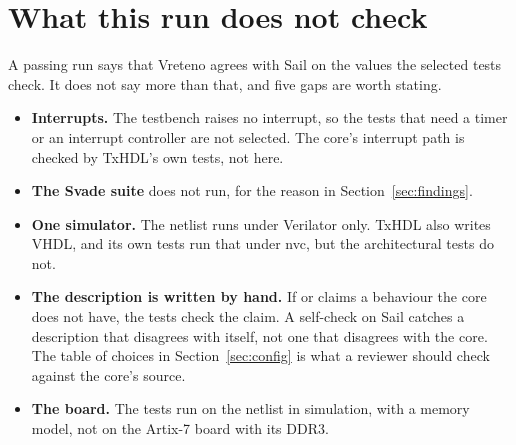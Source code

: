 \section{What this run does not check}
\label{sec:limits}

A passing run says that Vreteno agrees with Sail on the values the
selected tests check. It does not say more than that, and five gaps
are worth stating.

\begin{itemize}
\item \textbf{Interrupts.} The testbench raises no interrupt, so the
tests that need a timer or an interrupt controller are not selected.
The core's interrupt path is checked by TxHDL's own tests, not here.
\item \textbf{The Svade suite} does not run, for the reason in
Section~\ref{sec:findings}.
\item \textbf{One simulator.} The netlist runs under Verilator only.
TxHDL also writes VHDL, and its own tests run that under nvc, but the
architectural tests do not.
\item \textbf{The description is written by hand.} If
 or  claims a behaviour the core
does not have, the tests check the claim. A self-check on Sail
catches a description that disagrees with itself, not one that
disagrees with the core. The table of choices in
Section~\ref{sec:config} is what a reviewer should check against the
core's source.
\item \textbf{The board.} The tests run on the netlist in simulation,
with a memory model, not on the Artix-7 board with its DDR3.
\end{itemize}
